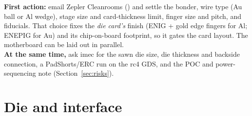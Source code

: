 \documentclass[10pt,a4paper]{article}
\begin{document}
\begin{gatebox}
\textbf{First action:} email Zepler Cleanrooms () and settle the bonder, wire type (Au ball or Al wedge), stage size and card-thickness limit, finger size and pitch, and fiducials. That choice fixes the \emph{die card's} finish (ENIG + gold edge fingers for Al; ENEPIG for Au) and its chip-on-board footprint, so it gates the card layout. The motherboard can be laid out in parallel.\\
\textbf{At the same time,} ask imec for the sawn die size, die thickness and backside connection, a PadShorts/ERC run on the rc4 GDS, and the POC and power-sequencing note (Section~\ref{sec:risks}).
\end{gatebox}

\newpage
\section{Die and interface}\label{sec:die}
\end{document}

